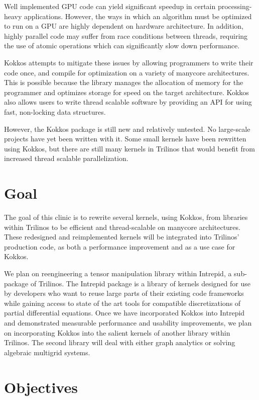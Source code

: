 \documentclass[proposal]{hmcclinic}
\begin{document}
Well implemented GPU code can yield significant speedup in certain
processing-heavy applications.  However, the ways in which an algorithm must be
optimized to run on a GPU are highly dependent on hardware architecture.  In
addition, highly parallel code may suffer from race conditions between threads,
requiring the use of atomic operations which can significantly slow down performance.

Kokkos attempts to mitigate these issues by allowing programmers to write their
code once, and compile for optimization on a variety of manycore architectures.
This is possible because the library manages the allocation of memory for the
programmer and optimizes storage for speed on the target architecture. Kokkos
also allows users to write thread scalable software by providing an API for
using fast, non-locking data structures.

However, the Kokkos package is still new and relatively untested.  No
large-scale projects have yet been written with it.  Some small kernels have
been rewritten using Kokkos, but there are still many kernels in Trilinos that
would benefit from increased thread scalable parallelization.


\section{Goal}

The goal of this clinic is to rewrite several kernels, using Kokkos, from libraries within
Trilinos to be efficient and thread-scalable on manycore architectures.  
These redesigned and reimplemented kernels will be integrated into
Trilinos' production code, as both a performance improvement and as a use case
for Kokkos.

We plan on reengineering a tensor manipulation library within Intrepid, a sub-package of Trilinos. 
The Intrepid package is
a library of kernels designed for use by developers who want to reuse large
parts of their existing code frameworks while gaining access to state of the art
tools for compatible discretizations of partial differential equations. Once we
have incorporated Kokkos into Intrepid and demonstrated measurable performance
and usability improvements, we plan on incorporating Kokkos into the salient
kernels of another library within Trilinos.  The second library will deal with
either graph analytics or solving algebraic multigrid systems.
\section{Objectives}
\end{document}
